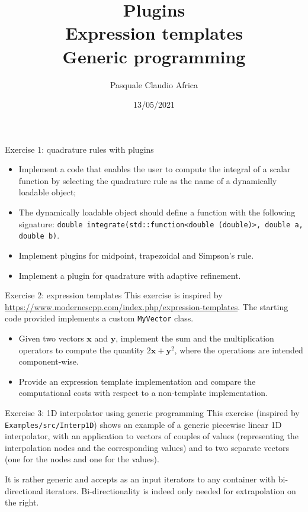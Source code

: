 \documentclass[10pt]{beamer}
\begin{document}
    \title{Plugins \protect\\ Expression templates \protect\\ Generic programming}
    \author{Pasquale Claudio Africa}
    \date{13/05/2021}

\begin{frame}
    \maketitle
\end{frame}

\begin{frame}{Exercise 1: quadrature rules with plugins}
\begin{itemize}
\item Implement a code that enables the user to compute the integral of a scalar function by selecting the quadrature rule as the name of a dynamically loadable object;
\item The dynamically loadable object should define a function with the following signature:
\texttt{double integrate(std::function<double (double)>, double a, double b)}.
\item Implement plugins for midpoint, trapezoidal and Simpson's rule.
\item Implement a plugin for quadrature with adaptive refinement.
\end{itemize}
\end{frame}

\begin{frame}{Exercise 2: expression templates}
This exercise is inspired by \url{https://www.modernescpp.com/index.php/expression-templates}.
\vfill
The starting code provided implements a custom \texttt{MyVector} class.
\begin{itemize}
\item Given two vectors $\mathbf{x}$ and $\mathbf{y}$, implement the sum and the multiplication operators to compute the quantity $2\mathbf{x} + \mathbf{y}^2$, where the operations are intended component-wise.
\item Provide an expression template implementation and compare the computational costs with respect to a non-template implementation.
\end{itemize}
\end{frame}

\begin{frame}{Exercise 3: 1D interpolator using generic programming}
This exercise (inspired by \texttt{Examples/src/Interp1D}) shows an example of a generic piecewise linear 1D interpolator, with an application to
vectors of couples of values (representing the interpolation nodes and the corresponding values) and to two separate vectors (one for the nodes and one for the values).

It is rather generic and accepts as an input iterators to any container with bi-directional iterators. Bi-directionality is indeed only needed for extrapolation on the right.
\end{frame}
\end{document}
